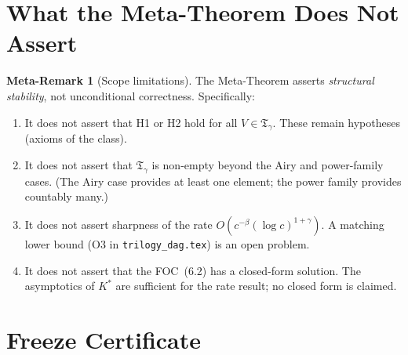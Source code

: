 \documentclass[12pt,a4paper]{amsart}
\theoremstyle{definition}
\newtheorem{metaremark}[metatheorem]{Meta-Remark}
\newcommand{\Tg}{\mathfrak{T}_\gamma}
\begin{document}
\section{What the Meta-Theorem Does Not Assert}
\label{sec:limits}

\begin{metaremark}[Scope limitations]
\label{mrem:limits}
The Meta-Theorem asserts \emph{structural stability},
not unconditional correctness.
Specifically:
\begin{enumerate}[label=(L\arabic*),leftmargin=3em,nosep]
  \item It does not assert that H1 or H2 hold for all
    $V\in\Tg$. These remain hypotheses (axioms of the class).
  \item It does not assert that $\Tg$ is non-empty
    beyond the Airy and power-family cases.
    (The Airy case provides at least one element;
    the power family provides countably many.)
  \item It does not assert sharpness of the rate
    $O(c^{-\beta}(\log c)^{1+\gamma})$.
    A matching lower bound (O3 in \texttt{trilogy\_dag.tex})
    is an open problem.
  \item It does not assert that the FOC~(6.2) has a
    closed-form solution. The asymptotics of $K^*$
    are sufficient for the rate result;
    no closed form is claimed.
\end{enumerate}
\end{metaremark}

\section{Freeze Certificate}
\label{sec:certificate}
\end{document}
